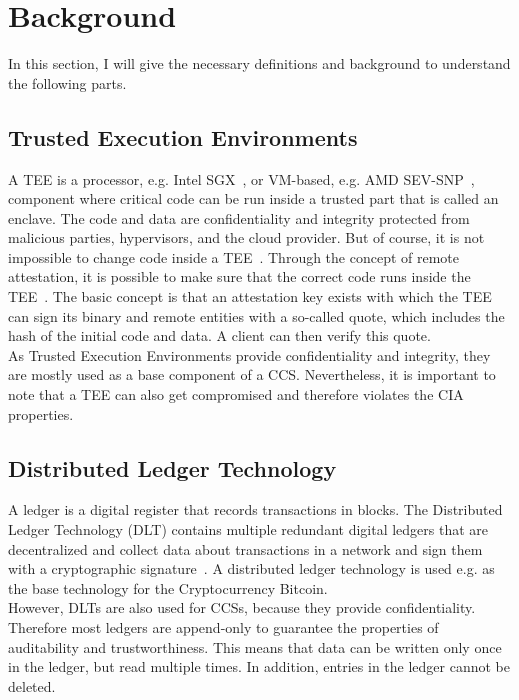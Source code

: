\section{Background}
In this section, I will give the necessary definitions and background to understand the following parts. 
\subsection{Trusted Execution Environments}
A TEE is a processor, e.g. Intel SGX~\cite{sgx}, or VM-based, e.g. AMD SEV-SNP~\cite{amd}, component where critical code can be run inside a trusted part that is called an enclave. The code and data are confidentiality and integrity protected from malicious parties, hypervisors, and the cloud provider.  But of course, it is not impossible to change code inside a TEE~\cite{tee_insec}.
Through the concept of remote attestation, it is possible to make sure that the correct code runs inside the TEE~\cite{remoteAttestation}.  The basic concept is that an attestation key exists with which the TEE can sign its binary and remote entities with a so-called quote, which includes the hash of the initial code and data. A client can then verify this quote. \\ 
As Trusted Execution Environments provide confidentiality and integrity, they are mostly used as a base component of a CCS. Nevertheless, it is important to note that a TEE can also get compromised and therefore violates the CIA properties.
\subsection{Distributed Ledger Technology}
A ledger is a digital register that records transactions in blocks. The Distributed Ledger Technology (DLT) contains multiple redundant digital ledgers that are decentralized and collect data about transactions in a network and sign them with a cryptographic signature~\cite{ledger}. A distributed ledger technology is used e.g. as the base technology for the Cryptocurrency Bitcoin.\\
 However, DLTs are also used for CCSs, because they provide confidentiality. Therefore most ledgers are append-only to guarantee the properties of auditability and trustworthiness. This means that data can be written only once in the ledger, but read multiple times. In addition, entries in the ledger cannot be deleted. 
